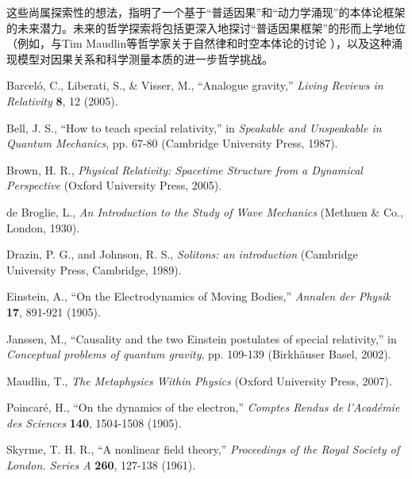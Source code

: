 \documentclass[12pt, a4paper]{article}
\begin{document}
这些尚属探索性的想法，指明了一个基于``普适因果''和``动力学涌现''的本体论框架的未来潜力。未来的哲学探索将包括更深入地探讨``普适因果框架''的形而上学地位（例如，与Tim Maudlin等哲学家关于自然律和时空本体论的讨论 \cite{Maudlin2007}），以及这种涌现模型对因果关系和科学测量本质的进一步哲学挑战。

\begin{thebibliography}{99}

Barceló, C., Liberati, S., \& Visser, M., ``Analogue gravity,'' \textit{Living Reviews in Relativity} \textbf{8}, 12 (2005).

Bell, J. S., ``How to teach special relativity,'' in \textit{Speakable and Unspeakable in Quantum Mechanics}, pp. 67-80 (Cambridge University Press, 1987).

Brown, H. R., \textit{Physical Relativity: Spacetime Structure from a Dynamical Perspective} (Oxford University Press, 2005).

de Broglie, L., \textit{An Introduction to the Study of Wave Mechanics} (Methuen \& Co., London, 1930).

Drazin, P. G., and Johnson, R. S., \textit{Solitons: an introduction} (Cambridge University Press, Cambridge, 1989).

Einstein, A., ``On the Electrodynamics of Moving Bodies,'' \textit{Annalen der Physik} \textbf{17}, 891-921 (1905).

Janssen, M., ``Causality and the two Einstein postulates of special relativity,'' in \textit{Conceptual problems of quantum gravity}, pp. 109-139 (Birkhäuser Basel, 2002).

Maudlin, T., \textit{The Metaphysics Within Physics} (Oxford University Press, 2007).

Poincaré, H., ``On the dynamics of the electron,'' \textit{Comptes Rendus de l'Académie des Sciences} \textbf{140}, 1504-1508 (1905).

Skyrme, T. H. R., ``A nonlinear field theory,'' \textit{Proceedings of the Royal Society of London. Series A} \textbf{260}, 127-138 (1961).

\end{thebibliography}
\end{document}
